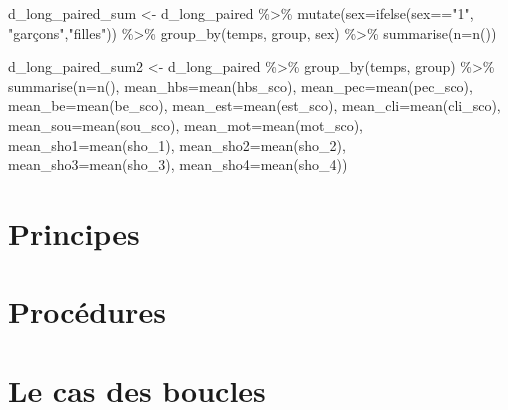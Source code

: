 \documentclass[
  letterpaper,
  DIV=11,
  numbers=noendperiod]{scrreprt}
\newenvironment{Shaded}{\begin{snugshade}}{\end{snugshade}}
\newcommand{\AttributeTok}[1]{\textcolor[rgb]{0.40,0.45,0.13}{#1}}
\newcommand{\FunctionTok}[1]{\textcolor[rgb]{0.28,0.35,0.67}{#1}}
\newcommand{\NormalTok}[1]{\textcolor[rgb]{0.00,0.23,0.31}{#1}}
\newcommand{\OtherTok}[1]{\textcolor[rgb]{0.00,0.23,0.31}{#1}}
\newcommand{\SpecialCharTok}[1]{\textcolor[rgb]{0.37,0.37,0.37}{#1}}
\newcommand{\StringTok}[1]{\textcolor[rgb]{0.13,0.47,0.30}{#1}}
\begin{document}
\begin{Shaded}
\begin{Highlighting}[]
\NormalTok{d\_long\_paired\_sum }\OtherTok{\textless{}{-}}\NormalTok{ d\_long\_paired }\SpecialCharTok{\%\textgreater{}\%} 
   \FunctionTok{mutate}\NormalTok{(}\AttributeTok{sex=}\FunctionTok{ifelse}\NormalTok{(sex}\SpecialCharTok{==}\StringTok{"1"}\NormalTok{, }\StringTok{"garçons"}\NormalTok{,}\StringTok{"filles"}\NormalTok{)) }\SpecialCharTok{\%\textgreater{}\%} 
   \FunctionTok{group\_by}\NormalTok{(temps, group, sex) }\SpecialCharTok{\%\textgreater{}\%} 
  \FunctionTok{summarise}\NormalTok{(}\AttributeTok{n=}\FunctionTok{n}\NormalTok{())}

\NormalTok{d\_long\_paired\_sum2 }\OtherTok{\textless{}{-}}\NormalTok{ d\_long\_paired }\SpecialCharTok{\%\textgreater{}\%} 
  \FunctionTok{group\_by}\NormalTok{(temps, group) }\SpecialCharTok{\%\textgreater{}\%} 
  \FunctionTok{summarise}\NormalTok{(}\AttributeTok{n=}\FunctionTok{n}\NormalTok{(),}
            \AttributeTok{mean\_hbs=}\FunctionTok{mean}\NormalTok{(hbs\_sco),}
            \AttributeTok{mean\_pec=}\FunctionTok{mean}\NormalTok{(pec\_sco),}
            \AttributeTok{mean\_be=}\FunctionTok{mean}\NormalTok{(be\_sco),}
            \AttributeTok{mean\_est=}\FunctionTok{mean}\NormalTok{(est\_sco),}
            \AttributeTok{mean\_cli=}\FunctionTok{mean}\NormalTok{(cli\_sco),}
            \AttributeTok{mean\_sou=}\FunctionTok{mean}\NormalTok{(sou\_sco),}
            \AttributeTok{mean\_mot=}\FunctionTok{mean}\NormalTok{(mot\_sco),}
            \AttributeTok{mean\_sho1=}\FunctionTok{mean}\NormalTok{(sho\_1),}
            \AttributeTok{mean\_sho2=}\FunctionTok{mean}\NormalTok{(sho\_2),}
            \AttributeTok{mean\_sho3=}\FunctionTok{mean}\NormalTok{(sho\_3),}
            \AttributeTok{mean\_sho4=}\FunctionTok{mean}\NormalTok{(sho\_4))}
\end{Highlighting}
\end{Shaded}

\hypertarget{principes}{%
\section{Principes}\label{principes}}

\hypertarget{procuxe9dures}{%
\section{Procédures}\label{procuxe9dures}}

\hypertarget{le-cas-des-boucles}{%
\section{Le cas des boucles}\label{le-cas-des-boucles}}
\end{document}
